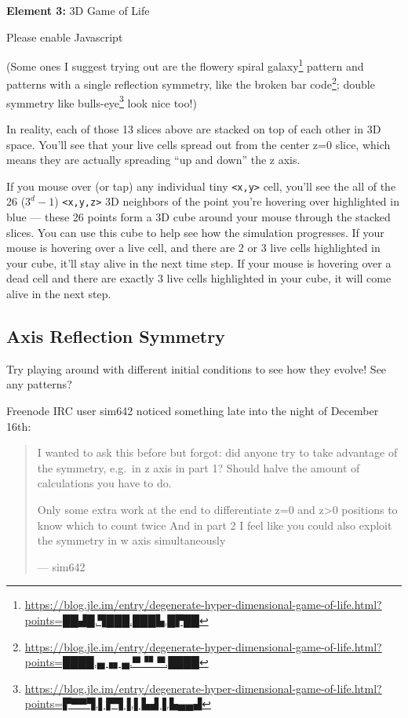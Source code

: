 \documentclass[]{article}
\renewcommand{\href}[2]{#2\footnote{\url{#1}}}
\begin{document}
\leavevmode\hypertarget{gol3D}{}%
\textbf{Element 3:} 3D Game of Life

\leavevmode\hypertarget{gol3DCont}{}%
Please enable Javascript

(Some ones I suggest trying out are the flowery
\href{https://blog.jle.im/entry/degenerate-hyper-dimensional-game-of-life.html?points=██▟█.▜███.███▙.█▛██}{spiral
galaxy} pattern and patterns with a single reflection symmetry, like the
\href{https://blog.jle.im/entry/degenerate-hyper-dimensional-game-of-life.html?points=████.▄▗▖▄.▀▝▘▀.████}{broken
bar code}; double symmetry like
\href{https://blog.jle.im/entry/degenerate-hyper-dimensional-game-of-life.html?points=▛▀▀▜.▌▛▜▐.▌▙▟▐.▙▄▄▟}{bulls-eye}
look nice too!)

In reality, each of those 13 slices above are stacked on top of each other in 3D
space. You'll see that your live cells spread out from the center z=0 slice,
which means they are actually spreading ``up and down'' the z axis.

If you mouse over (or tap) any individual tiny
\texttt{\textless{}x,y\textgreater{}} cell, you'll see the all of the 26
(\(3^d-1\)) \texttt{\textless{}x,y,z\textgreater{}} 3D neighbors of the point
you're hovering over highlighted in blue --- these 26 points form a 3D cube
around your mouse through the stacked slices. You can use this cube to help see
how the simulation progresses. If your mouse is hovering over a live cell, and
there are 2 or 3 live cells highlighted in your cube, it'll stay alive in the
next time step. If your mouse is hovering over a dead cell and there are exactly
3 live cells highlighted in your cube, it will come alive in the next step.

\hypertarget{axis-reflection-symmetry}{%
\subsection{Axis Reflection Symmetry}\label{axis-reflection-symmetry}}

Try playing around with different initial conditions to see how they evolve! See
any patterns?

Freenode IRC user sim642 noticed something late into the night of December 16th:

\begin{quote}
I wanted to ask this before but forgot: did anyone try to take advantage of the
symmetry, e.g.~in z axis in part 1? Should halve the amount of calculations you
have to do.

Only some extra work at the end to differentiate z=0 and z\textgreater0
positions to know which to count twice And in part 2 I feel like you could also
exploit the symmetry in w axis simultaneously

--- sim642
\end{quote}
\end{document}
